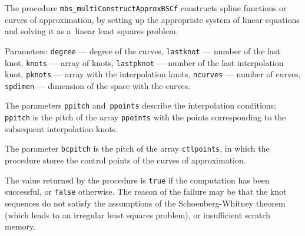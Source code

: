 \vspace{\bigskipamount}
\begin{sloppypar}
The procedure \texttt{mbs\_multiConstructApproxBSCf} constructs spline
functions or curves of approximation, by setting up the appropriate
system of linear equations and solving it as a~linear least squares problem.
\end{sloppypar}

Parameters: \texttt{degree} --- degree of the curves, \texttt{lastknot} ---
number of the last knot, \texttt{knots} --- array of knots,
\texttt{lastpknot} --- number of the last interpolation knot,
\texttt{pknots} --- array with the interpolation knots, \texttt{ncurves} ---
number of curves, \texttt{spdimen} --- dimension of the space with the curves.

\begin{sloppypar}
The parameters \texttt{ppitch} and~\texttt{ppoints} describe the
interpolation conditions; \texttt{ppitch} is the pitch of the array
\texttt{ppoints} with the points corresponding to the subsequent
interpolation knots.
\end{sloppypar}

The parameter \texttt{bcpitch} is the pitch of the array \texttt{ctlpoints},
in which the procedure stores the control points of the curves of
approximation.

The value returned by the procedure is \texttt{true} if the computation
has been successful, or \texttt{false} otherwise. The reason of the failure
may be that the knot sequences do not satisfy the assumptions of the
Schoenberg-Whitney theorem (which leads to an irregular least squares problem),
or insufficient scratch memory.

